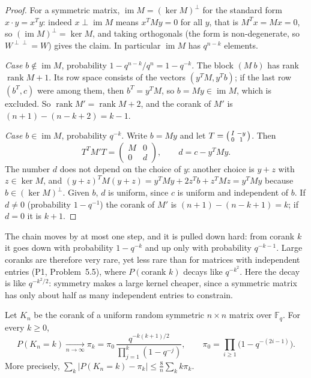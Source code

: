 \begin{proof}
For a symmetric matrix, $\operatorname{im}M=(\ker M)^\perp$ for the standard form $x\cdot y=x^Ty$: indeed $x\perp\operatorname{im}M$ means $x^TMy=0$ for all $y$, that is $M^Tx=Mx=0$, so $(\operatorname{im}M)^\perp=\ker M$, and taking orthogonals (the form is non-degenerate, so $W^{\perp\perp}=W$) gives the claim. In particular $\operatorname{im}M$ has $q^{n-k}$ elements.

\emph{Case $b\notin\operatorname{im}M$}, probability $1-q^{n-k}/q^n=1-q^{-k}$. The block $(M\ b)$ has rank $\operatorname{rank}M+1$. Its row space consists of the vectors $(y^TM,y^Tb)$; if the last row $(b^T,c)$ were among them, then $b^T=y^TM$, so $b=My\in\operatorname{im}M$, which is excluded. So $\operatorname{rank}M'=\operatorname{rank}M+2$, and the corank of $M'$ is $(n+1)-(n-k+2)=k-1$.

\emph{Case $b\in\operatorname{im}M$}, probability $q^{-k}$. Write $b=My$ and let $T=\begin{psmallmatrix}I&-y\\0&1\end{psmallmatrix}$. Then
\[
T^TM'T=\begin{pmatrix}M&0\\0&d\end{pmatrix},\qquad d=c-y^TMy.
\]
The number $d$ does not depend on the choice of $y$: another choice is $y+z$ with $z\in\ker M$, and $(y+z)^TM(y+z)=y^TMy+2z^Tb+z^TMz=y^TMy$ because $b\in(\ker M)^\perp$. Given $b$, $d$ is uniform, since $c$ is uniform and independent of $b$. If $d\ne0$ (probability $1-q^{-1}$) the corank of $M'$ is $(n+1)-(n-k+1)=k$; if $d=0$ it is $k+1$.
\end{proof}

The chain moves by at most one step, and it is pulled down hard: from corank $k$ it goes down with probability $1-q^{-k}$ and up only with probability $q^{-k-1}$. Large coranks are therefore very rare, yet less rare than for matrices with independent entries (P1, Problem~5.5), where $P(\text{corank }k)$ decays like $q^{-k^2}$. Here the decay is like $q^{-k^2/2}$: symmetry makes a large kernel cheaper, since a symmetric matrix has only about half as many independent entries to constrain.

\begin{theorem}\label{thm:coranklaw}
Let $K_n$ be the corank of a uniform random symmetric $n\times n$ matrix over $\mathbb F_q$. For every $k\ge0$,
\[
P(K_n=k)\xrightarrow[n\to\infty]{}\pi_k=\pi_0\,\frac{q^{-k(k+1)/2}}{\prod_{j=1}^k(1-q^{-j})},\qquad\pi_0=\prod_{i\ge1}\bigl(1-q^{-(2i-1)}\bigr).
\]
More precisely, $\sum_k|P(K_n=k)-\pi_k|\le\frac8n\sum_kk\pi_k$.
\end{theorem}

